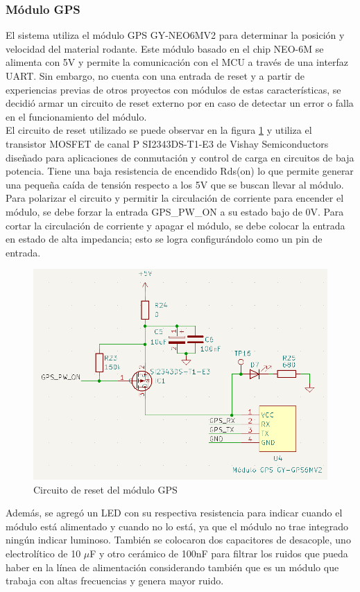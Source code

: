 \subsubsection{Módulo GPS}


El sistema utiliza el módulo GPS GY-NEO6MV2 para determinar la posición y velocidad del material rodante. Este módulo basado en el chip NEO-6M se alimenta con 5V y permite la comunicación con el MCU a través de una interfaz UART. Sin embargo, no cuenta con una entrada de reset y a partir de experiencias previas de otros proyectos con módulos de estas características, se decidió armar un circuito de reset externo por en caso de detectar un error o falla en el funcionamiento del módulo. \\ 

El circuito de reset utilizado se puede observar en la figura \ref{fig:gps_sch} y utiliza el transistor MOSFET de canal P SI2343DS-T1-E3 de Vishay Semiconductors \cite{SI2343DS-T1-E3} diseñado para aplicaciones de conmutación y  control de carga en circuitos de baja potencia. Tiene una baja resistencia de encendido Rds(on) lo que permite generar una pequeña caída de tensión respecto a los 5V que se buscan llevar al módulo. Para polarizar el circuito y permitir la circulación de corriente para encender el módulo, se debe forzar la entrada GPS\_PW\_ON a su estado bajo de 0V. Para cortar la circulación de corriente y apagar el módulo, se debe colocar la entrada en estado de alta impedancia; esto se logra configurándolo como un pin de entrada.\\ 

\begin{figure}[H]
    \centering
    \includegraphics[width = 0.8 \linewidth]{img/gps_sch.png}
    \caption{Circuito de reset del módulo GPS}
    \label{fig:gps_sch}
\end{figure}    

Además, se agregó un LED con su respectiva resistencia para indicar cuando el módulo está alimentado y cuando no lo está, ya que el módulo no trae integrado ningún indicar luminoso. También se colocaron dos capacitores de desacople, uno electrolítico de 10 $\mu$F y otro cerámico de 100nF para filtrar los ruidos que pueda haber en la línea de alimentación considerando también que es un módulo que trabaja con altas frecuencias y genera mayor ruido. 
